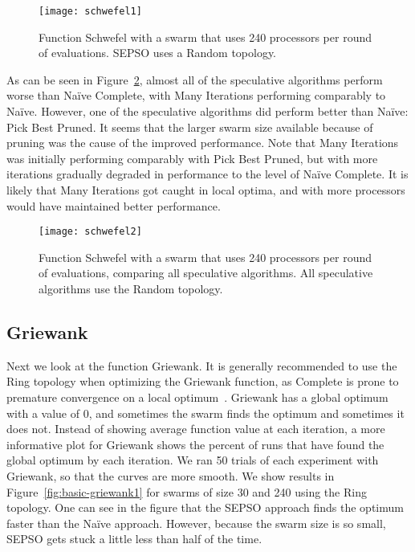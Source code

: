 \documentclass[smallcondensed]{svjour3}
\newcommand{\fig}[1]{Figure~\ref{fig:#1}}
\begin{document}
\begin{figure}
  \centering
  \texttt{[image: schwefel1]}
  \caption{Function Schwefel with a swarm that uses 240 processors per round of
  evaluations.  SEPSO uses a Random topology.}
  \label{fig:schwefel1}
\end{figure}

As can be seen in \fig{schwefel2}, almost all of the speculative algorithms
perform worse than Na\"ive Complete, with Many Iterations performing comparably
to Na\"ive.  However, one of the speculative algorithms did perform better than
Na\"ive: Pick Best Pruned.  It seems that the larger swarm size available
because of pruning was the cause of the improved performance.  Note that Many
Iterations was initially performing comparably with Pick Best Pruned, but with
more iterations gradually degraded in performance to the level of Na\"ive
Complete.  It is likely that Many Iterations got caught in local optima, and
with more processors would have maintained better performance.

\begin{figure}
  \centering
  \texttt{[image: schwefel2]}
  \caption{Function Schwefel with a swarm that uses 240 processors per round of
  evaluations, comparing all speculative algorithms.  All speculative
  algorithms use the Random topology.}
  \label{fig:schwefel2}
\end{figure}

\subsection{Griewank}

Next we look at the function Griewank.  It is generally recommended to use the
Ring topology when optimizing the Griewank function, as Complete is prone to
premature convergence on a local
optimum~\citep{bratton-2007-defining-a-standard-for-pso}.  Griewank has a
global optimum with a value of 0, and sometimes the swarm finds the optimum and
sometimes it does not.  Instead of showing average function value at each
iteration, a more informative plot for Griewank shows the percent of runs that
have found the global optimum by each iteration.  We ran 50 trials of each
experiment with Griewank, so that the curves are more smooth.  We show results
in \fig{basic-griewank1} for swarms of size 30 and 240 using the Ring topology.
One can see in the figure that the SEPSO approach finds the optimum faster than
the Na\"ive approach.  However, because the swarm size is so small, SEPSO gets
stuck a little less than half of the time.
\end{document}
